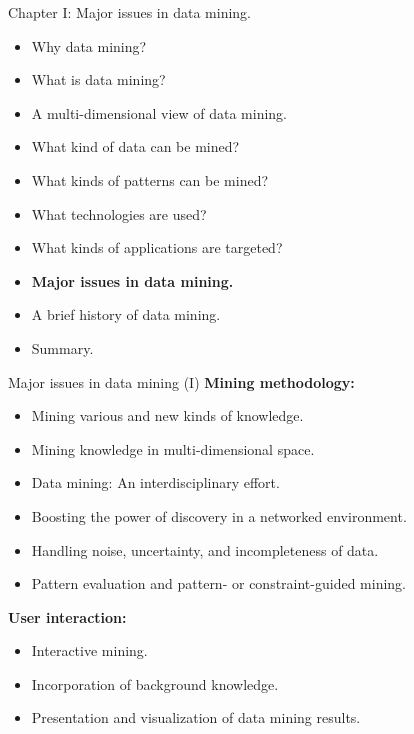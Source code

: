 \documentclass[aspectratio=169,t]{beamer}
\begin{document}
 { 
    \begin{frame}{Chapter I: Major issues in data mining.}
        \begin{itemize}
            \item Why data mining?
            \item What is data mining?
            \item A multi-dimensional view of data mining.
            \item What kind of data can be mined?
            \item What kinds of patterns can be mined?
            \item What technologies are used?
            \item What kinds of applications are targeted?
            \item \textbf{Major issues in data mining.}
            \item A brief history of data mining.
            \item Summary.
        \end{itemize}
    \end{frame}
  }

  {
    \begin{frame}{Major issues in data mining (I)}
    \textbf{Mining methodology:}\\
    \begin{itemize}
        \item Mining various and new kinds of knowledge.
        \item Mining knowledge in multi-dimensional space.
        \item Data mining: An interdisciplinary effort.
        \item Boosting the power of discovery in a networked environment.
        \item Handling noise, uncertainty, and incompleteness of data.
        \item Pattern evaluation and pattern- or constraint-guided mining.
    \end{itemize}
    \textbf{User interaction:}\\
    \begin{itemize}
        \item Interactive mining.
        \item Incorporation of background knowledge.
        \item Presentation and visualization of data mining results.
    \end{itemize}
    \end{frame}
  }
\end{document}
